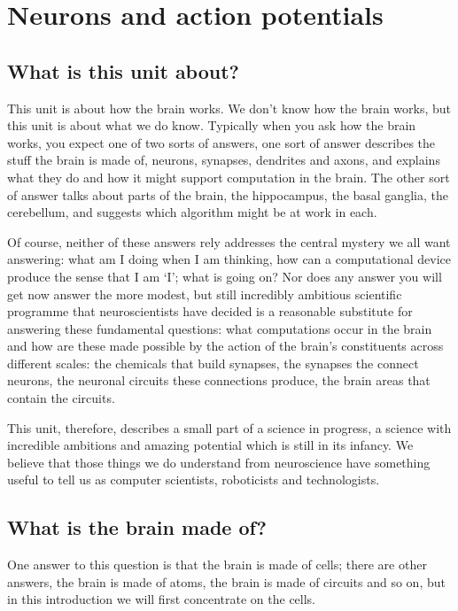 \documentclass[12pt]{article}
\begin{document}
\section*{Neurons and action potentials}

\subsection*{What is this unit about?} 
This unit is about how the brain works. We don't know how the brain
works, but this unit is about what we do know. Typically when you ask
how the brain works, you expect one of two sorts of answers, one sort
of answer describes the stuff the brain is made of, neurons, synapses,
dendrites and axons, and explains what they do and how it might
support computation in the brain. The other sort of answer talks about
parts of the brain, the hippocampus, the basal ganglia, the
cerebellum, and suggests which algorithm might be at work in each.

Of course, neither of these answers rely addresses the central mystery
we all want answering: what am I doing when I am thinking, how can a
computational device produce the sense that I am `I'; what is going
on? Nor does any answer you will get now answer the more modest, but
still incredibly ambitious scientific programme that neuroscientists have
decided is a reasonable substitute for answering these fundamental
questions: what computations occur in the brain and how are these made
possible by the action of the brain's constituents across different
scales: the chemicals that build synapses, the synapses the connect
neurons, the neuronal circuits these connections produce, the brain
areas that contain the circuits.

This unit, therefore, describes a small part of a science in progress,
a science with incredible ambitions and amazing potential which is
still in its infancy. We believe that those things we do understand
from neuroscience have something useful to tell us as computer
scientists, roboticists and technologists.

\subsection*{What is the brain made of?}

One answer to this question is that the brain is made of cells; there
are other answers, the brain is made of atoms, the brain is made of
circuits and so on, but in this introduction we will first concentrate
on the cells.
\end{document}
